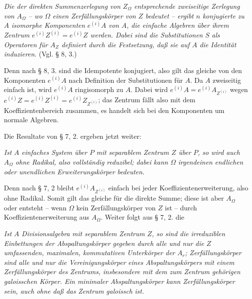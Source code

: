 \emph{Die der direkten Summenzerlegung von \(Z_\Omega\) entsprechende zweiseitige Zerlegung von \(A_\Omega\) -- wo \(\Omega\) einen Zerfällungskörper von \(Z\) bedeutet -- ergibt \(n\) konjugierte zu \(A\) isomorphe Komponenten \(e^{(i)}A\) von \(A\), die einfache Algebren über ihrem Zentrum \(e^{(i)}Z^{(i)}=e^{(i)}Z\) werden. Dabei sind die Substitutionen \(S\) als Operatoren für \(A_Z\) definiert durch die Festsetzung, daß sie auf \(A\) die Identität induzieren.} (Vgl. § 8, 3.)

Denn nach § 8, 3. sind die Idempotente konjugiert, also gilt das gleiche von den Komponenten \(e^{(i)}A\) nach Definition der Substitutionen für \(A\). Da \(A\) zweiseitig einfach ist, wird \(e^{(i)}A\) ringisomorph zu \(A\). Dabei wird \(e^{(i)}A=e^{(i)}A_{Z^{(i)}}\) wegen \(e^{(i)}Z=e^{(i)}Z^{(i)}=e^{(i)}Z_{Z^{(i)}}\); das Zentrum fällt also mit dem Koeffizientenbereich zusammen, es handelt sich bei den Komponenten um normale Algebren.

Die Resultate von § 7, 2. ergeben jetzt weiter:

\emph{Ist \(A\) einfaches System über \(P\) mit separablem Zentrum \(Z\) über \(P\), so wird auch \(A_\Omega\) ohne Radikal, also vollständig reduzibel; dabei kann \(\Omega\) irgendeinen endlichen oder unendlichen Erweiterungskörper bedeuten.}

Denn nach § 7, 2 bleibt \(e^{(i)}A_{Z^{(i)}}\) einfach bei jeder Koeffizientenerweiterung, also ohne Radikal. Somit gilt das gleiche für die direkte Summe; diese ist aber \(A_\Omega\) oder entsteht -- wenn \(\Omega\) kein Zerfällungskörper von \(Z\) ist -- durch Koeffizientenerweiterung aus \(A_\Omega\). Weiter folgt aus § 7, 2. die

\begin{center}
\textbf{}
\end{center}

\emph{Ist \(A\) Divisionsalgebra mit separablem Zentrum \(Z\), so sind die irreduziblen Einbettungen der Abspaltungskörper gegeben durch alle und nur die \(Z\) umfassenden, maximalen, kommutativen Unterkörper der \(A_r\); Zerfällungskörper sind alle und nur die Vereinigungskörper eines Abspaltungskörpers mit einem Zerfällungskörper des Zentrums, insbesondere mit dem zum Zentrum gehörigen galoisschen Körper. Ein minimaler Abspaltungskörper kann Zerfällungskörper sein, auch ohne daß das Zentrum galoissch ist.}


